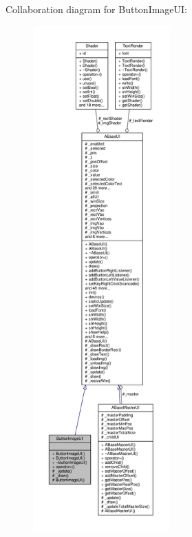 Collaboration diagram for Button\+Image\+UI\+:
\nopagebreak
\begin{figure}[H]
\begin{center}
\leavevmode
\includegraphics[height=550pt]{class_button_image_u_i__coll__graph}
\end{center}
\end{figure}
